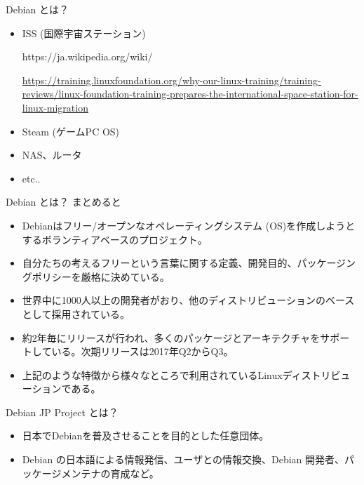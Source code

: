 \begin{frame}{Debian とは？}

\begin{itemize}
\item ISS (国際宇宙ステーション)
\begin{center}
 https://ja.wikipedia.org/wiki/%
\end{center}
{\tiny \url{https://training.linuxfoundation.org/why-our-linux-training/training-reviews/linux-foundation-training-prepares-the-international-space-station-for-linux-migration}}

\item Steam (ゲームPC OS)
\item NAS、ルータ
\item etc..
\end{itemize}

\end{frame}

\fi

\begin{frame}{Debian とは？}
まとめると\pause
\begin{itemize}[<+->]
\item Debianはフリー/オープンなオペレーティングシステム (OS)を作成しようとするボランティアベースのプロジェクト。
\item 自分たちの考えるフリーという言葉に関する定義、開発目的、パッケージングポリシーを厳格に決めている。
\item 世界中に1000人以上の開発者がおり、他のディストリビューションのベースとして採用されている。
\item 約2年毎にリリースが行われ、多くのパッケージとアーキテクチャをサポートしている。次期リリースは2017年Q2からQ3。
\item 上記のような特徴から様々なところで利用されているLinuxディストリビューションである。
\end{itemize}

\end{frame}

\begin{frame}{Debian JP Project とは？}
\pause
\begin{itemize}[<+->]
\item 日本でDebianを普及させることを目的とした任意団体。
\item Debian の日本語による情報発信、ユーザとの情報交換、Debian 開発者、パッケージメンテナの育成など。
\end{itemize}
\end{frame}


